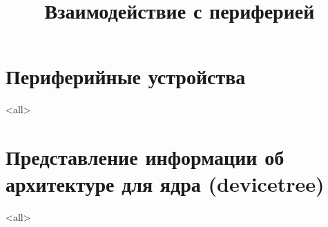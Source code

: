 

\title{Взаимодействие с периферией}



\begin{frame}
  \frametitle{}
\end{frame}

\section{Периферийные устройства}
\mode<all>{}
\section{Представление информации об архитектуре для ядра (devicetree)}
\mode<all>{}

